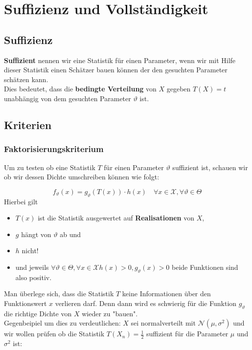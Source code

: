 \documentclass[a4paper]{article}
\begin{document}
\section{Suffizienz und Vollständigkeit}

\subsection{Suffizienz}

\textbf{Suffizient} nennen wir eine Statistik für einen Parameter, wenn
wir mit Hilfe dieser Statistik einen Schätzer bauen können der 
den gesuchten Parameter schätzen kann.
\\

Dies bedeutet, dass die \textbf{bedingte Verteilung} von $X$ gegeben
$T(X) = t$ unabhängig von dem gesuchten Parameter $\vartheta$ ist.

\subsection{Kriterien}

\subsubsection{Faktorisierungskriterium}
Um zu testen ob eine Statistik $T$ für einen Parameter $\vartheta$ suffizient
ist, schauen wir ob wir dessen Dichte umschreiben können wie folgt:

\[
	f_\vartheta (x) = g_{\vartheta} \left(
		T(x)
	\right) \cdot h(x) \quad \forall x \in \mathcal{X},
	\forall \vartheta \in \Theta
\] 
Hierbei gilt
\begin{itemize}
	\item $T(x)$ ist die Statistik ausgewertet auf \textbf{Realisationen} von $X$,
	\item $g$ hängt von $\vartheta$ ab und
	\item $h$ nicht!
	\item und jeweils $\forall \vartheta \in \Theta, \forall x \in \mathcal{X} 
		h(x) > 0, g_{\vartheta}(x) > 0$ beide Funktionen sind also
		positiv.
\end{itemize}

Man überlege sich, dass die Statistik $T$ keine Informationen über den
Funktionswert $x$ verlieren darf. Denn dann wird es schwierig für die
Funktion $g_{\vartheta}$ die richtige Dichte von $X$ wieder zu "bauen".
\\

Gegenbeipiel um dies zu verdeutlichen: 
$X$ sei normalverteilt mit $\mathcal{N}(\mu, \sigma ^2)$ und wir wollen
prüfen ob die Statistik $T(X_n) = \frac{ 1 }{ 2 }$ suffizient
für die Parameter $\mu$ und $\sigma ^2$ ist:
\end{document}
